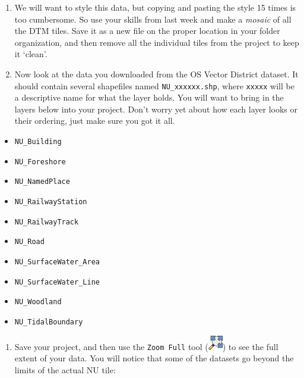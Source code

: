 \documentclass[
  letterpaper,
  DIV=11,
  numbers=noendperiod]{scrreprt}
\providecommand{\tightlist}{%
  \setlength{\itemsep}{0pt}\setlength{\parskip}{0pt}}\usepackage{longtable,booktabs,array}
\begin{document}
\begin{enumerate}
\def\labelenumi{(\arabic{enumi})}
\setcounter{enumi}{195}
\item
  We will want to style this data, but copying and pasting the style 15
  times is too cumbersome. So use your skills from last week and make a
  \emph{mosaic} of all the DTM tiles. Save it as a new file on the
  proper location in your folder organization, and then remove all the
  individual tiles from the project to keep it `clean'.
\item
  Now look at the data you downloaded from the OS Vector District
  dataset. It should contain several shapefiles named
  \texttt{NU\_xxxxxx.shp}, where \texttt{xxxxx} will be a descriptive
  name for what the layer holds. You will want to bring in the layers
  below into your project. Don't worry yet about how each layer looks or
  their ordering, just make sure you got it all.
\end{enumerate}

\begin{itemize}
\tightlist
\item
  \texttt{NU\_Building}
\item
  \texttt{NU\_Foreshore}
\item
  \texttt{NU\_NamedPlace}
\item
  \texttt{NU\_RailwayStation}
\item
  \texttt{NU\_RailwayTrack}
\item
  \texttt{NU\_Road}
\item
  \texttt{NU\_SurfaceWater\_Area}
\item
  \texttt{NU\_SurfaceWater\_Line}
\item
  \texttt{NU\_Woodland}
\item
  \texttt{NU\_TidalBoundary}
\end{itemize}

\begin{enumerate}
\def\labelenumi{(\arabic{enumi})}
\setcounter{enumi}{197}
\tightlist
\item
  Save your project, and then use the \texttt{Zoom\ Full} tool
  (\includegraphics{index_files/mediabag/mActionZoomFullExten.png}) to
  see the full extent of your data. You will notice that some of the
  datasets go beyond the limits of the actual NU tile:
\end{enumerate}
\end{document}
